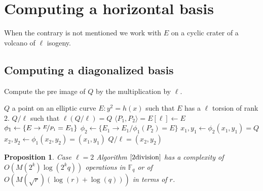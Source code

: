 \documentclass{article}
\theoremstyle{plain}
\newtheorem{prop}[thm]{Proposition}
\theoremstyle{definition}
\theoremstyle{remark}
\begin{document}
\section{Computing a horizontal basis}
When the contrary is  not mentioned we work with $E$ on a cyclic crater of a volcano of $\ell$ isogeny. 

\subsection{Computing a diagonalized basis}

\begin{algorithm}
\caption{\label{ldivision}Compute the pre image of $Q$ by the multiplication by $\ell$.}
\begin{algorithmic}[5]
\REQUIRE $Q$ a point on an elliptic curve $E: y^2=h(x)$ such that $E$ has a $\ell$ torsion of rank $2$.
\ENSURE $Q/\ell$ such that $\ell(Q/\ell)=Q$
\STATE $ \langle P_1,P_2 \rangle = E[\ell] \gets E $
\STATE $\phi_1  \gets \lbrace E\rightarrow \nicefrac{E}{P_1}=E_1 \rbrace $
\STATE $\phi_2  \gets \lbrace E_1\rightarrow {E_1}/{\phi_1(P_2)}=E \rbrace $
\STATE $x_1,y_1 \gets \phi_2(x_1,y_1)=Q $
\STATE $x_2,y_2 \gets \phi_1(x_2,y_2)=(x_1,y_1)  $
\RETURN $Q/\ell=(x_2,y_2)$
\end{algorithmic}
\end{algorithm}

\begin{prop}{Case $\ell=2$}
Algorithm $\ref{2division}$ has a complexity of $O(M(2^k)\log(2^kq))$ operations in $\mathbb{F}_q$ or of $O(M(\sqrt{r})(\log(r)+\log(q)))$ in terms of $r$.
\end{prop}
\end{document}
